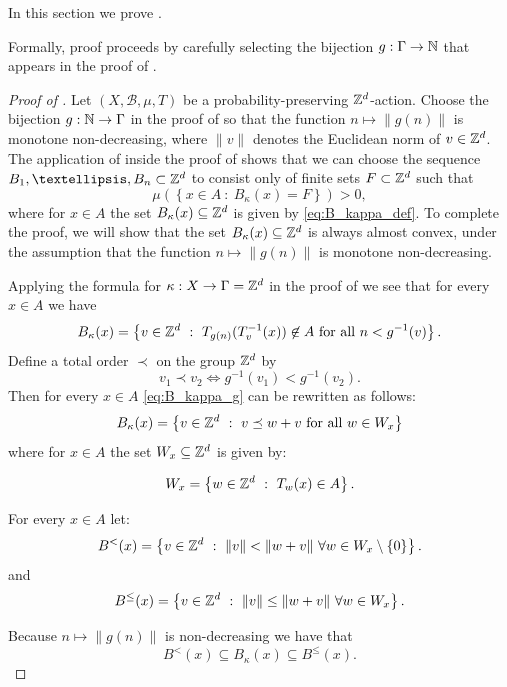 \documentclass[12pt,reqno]{amsart}
\begin{document}
In this section we prove .

Formally, proof proceeds by carefully selecting the bijection $g:\Gamma \to \mathbb{N}$ that appears in the proof of . 

\begin{proof}[Proof of ]
Let $(X,\mathcal{B},\mu,T)$ be a probability-preserving $\mathbb{Z}^d$-action.
Choose the bijection 
$g:\mathbb{N} \to \Gamma$ in the proof of  so that
the function $n \mapsto \|g(n)\|$ is monotone non-decreasing, where $\|v\|$ denotes the Euclidean norm of $v \in \mathbb{Z}^d$.
The application of  inside the proof of  shows that we can choose the sequence $B_1,\ldots,B_n \subset \Z^d$ to consist only of finite sets $F \subset \mathbb{Z}^d$ such that
\[
\mu \left( \left\{ x \in A~:~ B_\kappa(x) = F \right\}\right) >0,
\]
where for $x \in A$ the set $B_\kappa(x) \subseteq \mathbb{Z}^d$ is given by \eqref{eq:B_kappa_def}.
To complete the proof, we will show that the set $B_\kappa(x) \subseteq \mathbb{Z}^d$ is always almost convex, under the assumption that the function $n \mapsto \|g(n)\|$ is monotone non-decreasing.

Applying the formula for $\kappa:X \to \Gamma=\mathbb{Z}^d$ in the proof of 
we see that for every $x \in A$ we have
\begin{equation}\label{eq:B_kappa_g}
B_\kappa(x) = \left\{ v \in \Z^d~:~  T_{g(n)}(T_v^{-1}(x)) \not \in A \mbox{ for all } n< g^{-1}(v) \right\}.    
\end{equation}
Define a total order $\prec$ on the group $\mathbb{Z}^d$ by 
\[
v_1 \prec v_2 \Leftrightarrow 
g^{-1}(v_1) <  g^{-1}(v_2).
\]
Then for every $x \in A$ \eqref{eq:B_kappa_g} can be rewritten as follows:
\[
B_\kappa(x)= \left\{ v \in \mathbb{Z}^d ~:~ v \preceq w+v \mbox{ for all } w \in W_x \right\}
\]
where for $x \in A$ the set $W_x \subseteq \mathbb{Z}^d$ is given by:

\[
W_x =\left\{w \in \mathbb{Z}^d~:~ T_w(x) \in A \right\}.
\]

For every $x \in A$ let:
\[
B^{<}(x) = \left\{ v \in \mathbb{Z}^d~:~ \|v\| < \|w+v\| ~\forall w \in W_x \setminus \{0\} \right\}.
\]
and
\[
B^{\le}(x) =  \left\{ v \in \mathbb{Z}^d~:~ \|v\| \le \|w+v\| ~\forall w \in W_x  \right\}.
\]


Because  $n \mapsto \|g(n)\|$ is non-decreasing we have that
\[
B^{<}(x) \subseteq B_\kappa(x) \subseteq B^{\le}(x).
\]


\end{proof}
\end{document}
